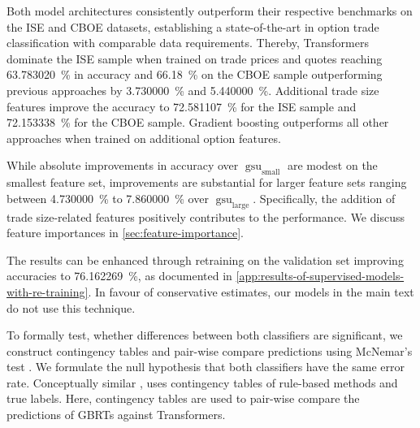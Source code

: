 Both model architectures consistently outperform their respective benchmarks on the \gls{ISE} and \gls{CBOE} datasets, establishing a state-of-the-art in option trade classification with comparable data requirements. Thereby, Transformers dominate the \gls{ISE} sample when trained on trade prices and quotes reaching \SI{63.783020}{\percent}  in accuracy and \SI{66.18}{\percent} on the \gls{CBOE} sample outperforming previous approaches by \SI{3.730000}{\percent} and \SI{5.440000}{\percent}. Additional trade size features improve the accuracy to \SI{72.581107}{\percent} for the \gls{ISE} sample and \SI{72.153338}{\percent} for the \gls{CBOE} sample. Gradient boosting outperforms all other approaches when trained on additional option features.

While absolute improvements in accuracy over $\operatorname{gsu}_{\mathrm{small}}$ are modest on the smallest feature set, improvements are substantial for larger feature sets ranging between \SI{4.730000}{\percent} to \SI{7.860000}{\percent} over $\operatorname{gsu}_{\mathrm{large}}$. Specifically, the addition of trade size-related features positively contributes to the performance. We discuss feature importances in \cref{sec:feature-importance}.

The results can be enhanced through retraining on the validation set improving accuracies to \SI{76.162269}{\percent}, as documented in \cref{app:results-of-supervised-models-with-re-training}. In favour of conservative estimates, our models in the main text do not use this technique.

To formally test, whether differences between both classifiers are significant, we construct contingency tables and pair-wise compare predictions using McNemar's test \autocite[][153--157]{mcnemarNoteSamplingError1947}. We formulate the null hypothesis that both classifiers have the same error rate.
Conceptually similar \textcite[][267]{odders-whiteOccurrenceConsequencesInaccurate2000}, uses contingency tables of rule-based methods and true labels. Here, contingency tables are used to pair-wise compare the predictions of \glspl{GBRT} against Transformers.

